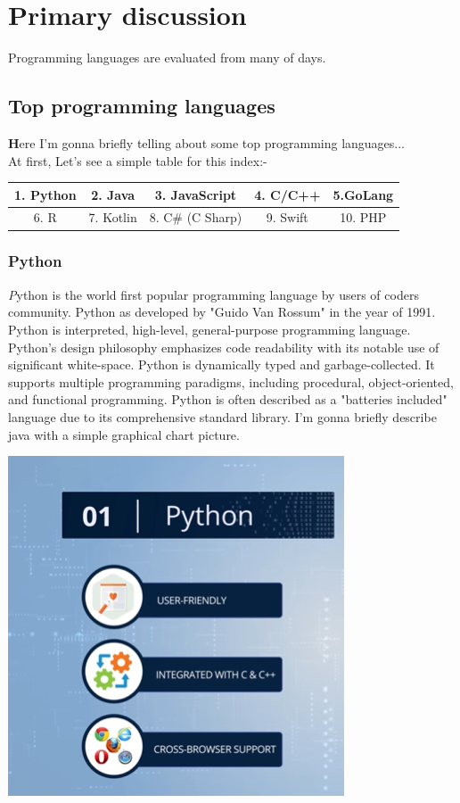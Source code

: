 \documentclass[paper = A5, headinclude, parskip = full, oneside, font = 11 pt]{report}
\begin{document}
\newpage

\tableofcontents

\newpage

\chapter{Primary discussion}
Programming languages are evaluated from many of days.

\color{green}
\section{Top programming languages}
\color{black}
\textbf{H}ere I'm gonna briefly telling about some top programming languages...\\

At first, Let's see a simple table for this index:-

\begin{center}

 \begin{tabular}{||c|c|c|c|c||}

 \hline
 \hline
 1. Python & 2. Java & 3. JavaScript & 4. C/C++ & 5.GoLang\\
 \hline
 6. R & 7. Kotlin & 8. C\# (C Sharp) & 9. Swift & 10. PHP\\
 \hline
 \hline
 
 \end{tabular}

\end{center}

\subsection{Python}
\emph{\textit{\large{P}}}ython is the world first popular programming language by users of coders community. Python as developed by "Guido Van Rossum" in the year of 1991. Python is interpreted, high-level, general-purpose programming language. Python's design philosophy emphasizes code readability with its notable use of significant white-space. Python is dynamically typed and garbage-collected. It supports multiple programming paradigms, including procedural, object-oriented, and functional programming. Python is often described as a "batteries included" language due to its comprehensive standard library. I'm gonna briefly describe java with a simple graphical chart picture. 
\begin{center}
 \includegraphics[width = 140 pt]{Python.png}
\end{center}
\end{document}
